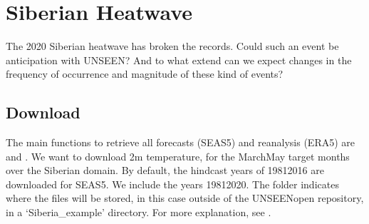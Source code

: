 \documentclass[letterpaper,10pt,english]{sphinxmanual}
\begin{document}
\section{Siberian Heatwave}
\label{\detokenize{Notebooks/Examples:Siberian-Heatwave}}
The 2020 Siberian heatwave has broken the records. Could such an event be anticipation with UNSEEN? And to what extend can we expect changes in the frequency of occurrence and magnitude of these kind of events?


\subsection{Download}
\label{\detokenize{Notebooks/Examples:Download}}
The main functions to retrieve all forecasts (SEAS5) and reanalysis (ERA5) are  and . We want to download 2m temperature, for the March\sphinxhyphen{}May target months over the Siberian domain. By default, the hindcast years of 1981\sphinxhyphen{}2016 are downloaded for SEAS5. We include the years 1981\sphinxhyphen{}2020. The folder indicates where the files will be stored, in this case outside of the UNSEEN\sphinxhyphen{}open repository, in a ‘Siberia\_example’ directory. For more explanation, see
{\hyperref[\detokenize{Notebooks/1.Download/1.Retrieve::doc}]{}}.

{
\begin{sphinxVerbatim}[commandchars=\\\{\}]
\llap{\color{nbsphinxin}[2]:\,\hspace{\fboxrule}\hspace{\fboxsep}}
    \PYG{p}{[} \PYG{p}{]}
    \PYG{p}{[}  \PYG{p}{]}
    \PYG{p}{[}   \PYG{p}{]}
     
\end{sphinxVerbatim}
}
\end{document}
